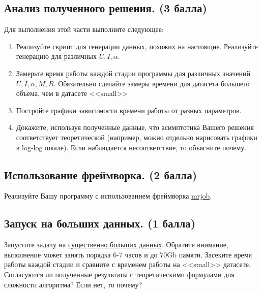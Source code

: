 \documentclass[11pt, fleqn]{article}
\begin{document}
\subsection{Анализ полученного решения. (3 балла)}
Для выполнения этой части выполните следующее:
\begin{enumerate}
	\item Реализуйте скрипт для генерации данных, похожих на настоящие. Реализуйте генерацию для различных $U, I, \alpha$.
	\item Замерьте время работы каждой стадии программы для различных значений $U, I, \alpha, M, R$. Обязательно сделайте замеры времени для датасета большего объема, чем в датасете <<small>>
	\item Постройте графики зависимости времени работы от разных параметров.
	\item Докажите, используя полученные данные, что асимптотика Вашего решения соответствует теоретической (например, можно отдельно нарисовать графики в log-log шкале). Если наблюдается несоответствие, то объясните почему.
\end{enumerate}
\subsection{Использование фреймворка. (2 балла)}
Реализуйте Вашу программу с использованием фреймворка \href{https://mrjob.readthedocs.io/en/latest/}{mrjob}.
\subsection{Запуск на больших данных. (1 балла)}
Запустите задачу на \href{https://grouplens.org/datasets/movielens/10m/}{существенно больших данных}. Обратите внимание, выполнение может занять порядка 6-7 часов и до 70Gb памяти. Засеките время работы каждой стадии и сравните с временем работы на <<small>> датасете. Согласуются ли полученные результаты с теоретическими формулами для сложности алгоритма? Если нет, то почему?
\end{document}
